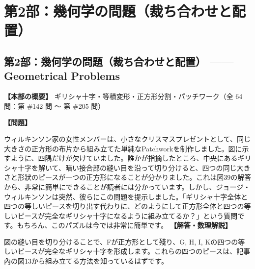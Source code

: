 \documentclass[10pt,a4paper,oneside,openany]{ltjsbook}
\begin{document}
\part{第2部：幾何学の問題（裁ち合わせと配置）}
\chapter*{第2部：幾何学の問題（裁ち合わせと配置） —— Geometrical Problems}

\textbf{【本部の概要】} ギリシャ十字・等積変形・正方形分割・パッチワーク（全 64 問：第 \#142 問 〜 第 \#205 問）

\vspace{1em}

\begin{tcolorbox}[colback=softblue,colframe=primaryblue,title=\textbf{第 142 問：シルクの Patchwork （原題: THE SILK PATCHWORK.）},arc=2mm,boxrule=1pt,breakable]
\textbf{【問題】}\par\vspace{0.3em}
ウィルキンソン家の女性メンバーは、小さなクリスマスプレゼントとして、同じ大きさの正方形の布片から組み立てた単純なPatchworkを制作しました。図に示すように、四隅だけが欠けていました。誰かが指摘したところ、中央にあるギリシャ十字を解いて、暗い接合部の縫い目を沿って切り分けると、四つの同じ大きさと形狀のピースが一つの正方形になることが分かりました。これは図39の解答から、非常に簡単にできることが読者には分かっています。しかし、ジョージ・ウィルキンソンは突然、彼らにこの問題を提示しました。「ギリシャ十字全体と四つの等しいピースを切り出す代わりに、どのようにして正方形全体と四つの等しいピースが完全なギリシャ十字になるように組み立てるか？」という質問です。もちろん、このパズルは今では非常に簡単です。
\tcblower
\textbf{【解答・数理解説】}\par\vspace{0.3em}
図の縫い目を切り分けることで、Fが正方形として殘り、G, H, I, Kの四つの等しいピースが完全なギリシャ十字を形成します。これらの四つのピースは、記事內の図13から組み立てる方法を知っているはずです。
\end{tcolorbox}
\end{document}
